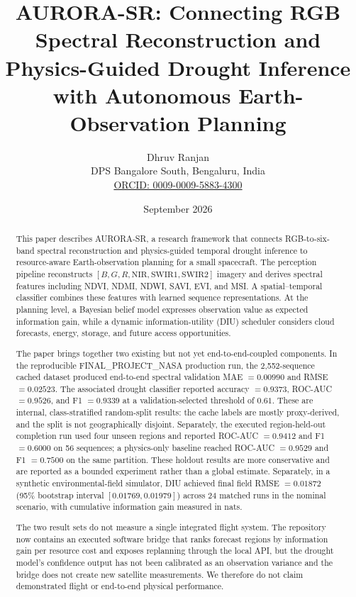 \documentclass[11pt,a4paper]{article}
\title{
\textbf{
AURORA-SR: Connecting RGB Spectral Reconstruction and
Physics-Guided Drought Inference with Autonomous
Earth-Observation Planning
}
}
\author{
Dhruv Ranjan\\
DPS Bangalore South, Bengaluru, India\\
\href{https://orcid.org/0009-0009-5883-4300}{ORCID: 0009-0009-5883-4300}
}
\date{September 2026}
\newcommand{\NIR}{\mathrm{NIR}}
\newcommand{\SWIRone}{\mathrm{SWIR1}}
\newcommand{\SWIRtwo}{\mathrm{SWIR2}}
\begin{document}
\maketitle


\begin{abstract}

This paper describes AURORA-SR, a research framework that connects
RGB-to-six-band spectral reconstruction and physics-guided temporal
drought inference to resource-aware Earth-observation planning for a
small spacecraft. The perception pipeline reconstructs
$[B,G,R,\NIR,\SWIRone,\SWIRtwo]$ imagery and derives spectral features
including NDVI, NDMI, NDWI, SAVI, EVI, and MSI. A spatial--temporal
classifier combines these features with learned sequence
representations. At the planning level, a Bayesian belief model
expresses observation value as expected information gain, while a
dynamic information-utility (DIU) scheduler considers cloud forecasts,
energy, storage, and future access opportunities.

The paper brings together two existing but not yet end-to-end-coupled
components. In the reproducible FINAL\_PROJECT\_NASA production run, the
2,552-sequence cached dataset produced end-to-end spectral validation MAE
$=0.00990$ and RMSE $=0.02523$. The associated drought classifier
reported accuracy $=0.9373$, ROC-AUC $=0.9526$, and F1 $=0.9339$ at a
validation-selected threshold of $0.61$. These are internal,
class-stratified random-split results: the cache labels are mostly
proxy-derived, and the split is not geographically disjoint. Separately,
the executed region-held-out completion run used four unseen regions and
reported ROC-AUC $=0.9412$ and F1 $=0.6000$ on 56 sequences; a
physics-only baseline reached ROC-AUC $=0.9529$ and F1 $=0.7500$ on the
same partition. These holdout results are more conservative and are
reported as a bounded experiment rather than a global estimate.
Separately,
in a synthetic environmental-field simulator, DIU achieved final field
RMSE $=0.01872$ (95\% bootstrap interval $[0.01769,0.01979]$) across
24 matched runs in the nominal scenario, with cumulative information
gain measured in nats.

The two result sets do not measure a single integrated flight system. The
repository now contains an executed software bridge that ranks forecast
regions by information gain per resource cost and exposes replanning
through the local API, but the drought model's confidence output has not
been calibrated as an observation variance and the bridge does not create
new satellite measurements. We therefore do not claim demonstrated
flight or end-to-end physical performance.

\end{abstract}
\end{document}
